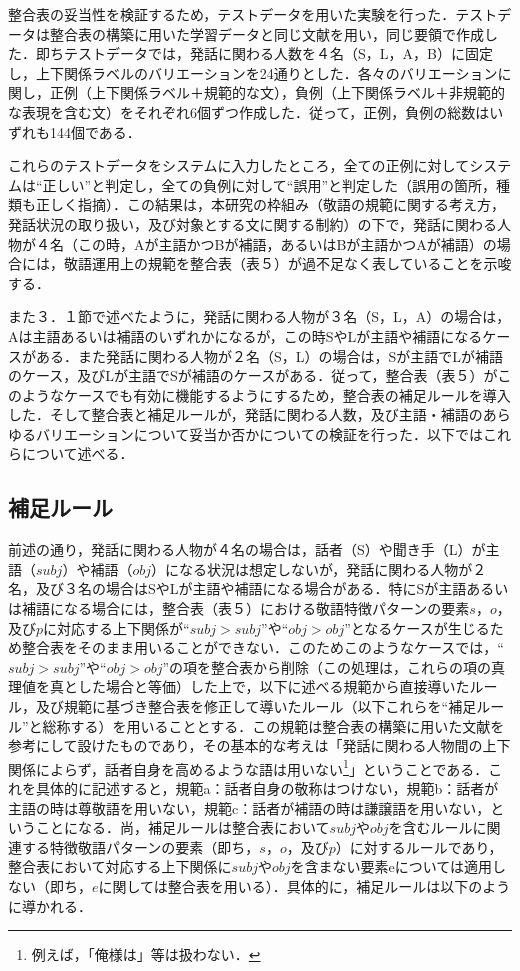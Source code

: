 \bigskip

整合表の妥当性を検証するため，テストデータを用いた実験を行った．テストデータは整合表の構築に用いた学習データと同じ文献を用い，同じ要領で作成した．即ちテストデータでは，発話に関わる人数を４名（S，L，A，B）に固定し，上下関係ラベルのバリエーションを24通りとした．各々のバリエーションに関し，正例（上下関係ラベル＋規範的な文），負例（上下関係ラベル＋非規範的な表現を含む文）をそれぞれ6個ずつ作成した．従って，正例，負例の総数はいずれも144個である．

これらのテストデータをシステムに入力したところ，全ての正例に対してシステムは``正しい''と判定し，全ての負例に対して``誤用''と判定した（誤用の箇所，種類も正しく指摘）．この結果は，本研究の枠組み（敬語の規範に関する考え方，発話状況の取り扱い，及び対象とする文に関する制約）の下で，発話に関わる人物が４名（この時，Aが主語かつBが補語，あるいはBが主語かつAが補語）の場合には，敬語運用上の規範を整合表（表５）が過不足なく表していることを示唆する．

また３．１節で述べたように，発話に関わる人物が３名（S，L，A）の場合は，Aは主語あるいは補語のいずれかになるが，この時SやLが主語や補語になるケースがある．また発話に関わる人物が２名（S，L）の場合は，Sが主語でLが補語のケース，及びLが主語でSが補語のケースがある．従って，整合表（表５）がこのようなケースでも有効に機能するようにするため，整合表の補足ルールを導入した．そして整合表と補足ルールが，発話に関わる人数，及び主語・補語のあらゆるバリエーションについて妥当か否かについての検証を行った．以下ではこれらについて述べる．

\subsection{補足ルール}
前述の通り，発話に関わる人物が４名の場合は，話者（S）や聞き手（L）が主語（$subj$）や補語（$obj$）になる状況は想定しないが，発話に関わる人物が２名，及び３名の場合はSやLが主語や補語になる場合がある．特にSが主語あるいは補語になる場合には，整合表（表５）における敬語特徴パターンの要素$s$，$o$，及び$p$に対応する上下関係が``$subj$$>$$subj$''や``$obj$$>$$obj$''となるケースが生じるため整合表をそのまま用いることができない．このためこのようなケースでは，``$subj$$>$$subj$''や``$obj$$>$$obj$''の項を整合表から削除（この処理は，これらの項の真理値を真とした場合と等価）した上で，以下に述べる規範から直接導いたルール，及び規範に基づき整合表を修正して導いたルール（以下これらを``補足ルール''と総称する）を用いることとする．この規範は整合表の構築に用いた文献を参考にして設けたものであり，その基本的な考えは「発話に関わる人物間の上下関係によらず，話者自身を高めるような語は用いない\footnote{例えば，「俺様は」等は扱わない．}」ということである．これを具体的に記述すると，規範a：話者自身の敬称はつけない，規範b：話者が主語の時は尊敬語を用いない，規範c：話者が補語の時は謙譲語を用いない，ということになる．尚，補足ルールは整合表において$subj$や$obj$を含むルールに関連する特徴敬語パターンの要素（即ち，$s$，$o$，及び$p$）に対するルールであり，整合表において対応する上下関係に$subj$や$obj$を含まない要素eについては適用しない（即ち，$e$に関しては整合表を用いる）．具体的に，補足ルールは以下のように導かれる．

